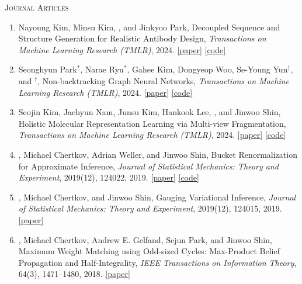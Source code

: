 \vspace{0.5\baselineskip}
\textsc{Journal Articles}
\begin{enumerate}
\item Nayoung Kim, Minsu Kim, , and Jinkyoo Park, Decoupled Sequence and Structure Generation for Realistic Antibody Design, \textit{Transactions on Machine Learning Research (TMLR)}, 2024. \mbox{\href{https://arxiv.org/abs/2402.05982}{[paper]}} \mbox{\href{https://github.com/nayoung10/ASSD}{[code]}}
\item Seonghyun Park$^*$, Narae Ryu$^*$, Gahee Kim, Dongyeop Woo, Se-Young Yun$^\dagger$, and $^\dagger$, Non-backtracking Graph Neural Networks, \textit{Transactions on Machine Learning Research (TMLR)}, 2024. \mbox{\href{https://arxiv.org/abs/2310.07430}{[paper]}} \mbox{\href{https://github.com/seonghyun26/nba-gnn}{[code]}}
\item Seojin Kim, Jaehyun Nam, Junsu Kim, Hankook Lee, , and Jinwoo Shin, Holistic Molecular Representation Learning via Multi-view Fragmentation, \textit{Transactions on Machine Learning Research (TMLR)}, 2024. \mbox{\href{https://openreview.net/forum?id=ufDh55J1ML}{[paper]}} \mbox{\href{https://github.com/Seojin-Kim/HoliMol}{[code]}}
\item {}, Michael Chertkov, Adrian Weller, and Jinwoo Shin, Bucket Renormalization for Approximate Inference, \textit{Journal of Statistical Mechanics: Theory and Experiment}, 2019(12), 124022, 2019. \mbox{\href{https://arxiv.org/abs/1803.05104}{[paper]}} \mbox{\href{https://github.com/sungsoo-ahn/bucket-renormalization}{[code]}}
\item {}, Michael Chertkov, and Jinwoo Shin, Gauging Variational Inference, \textit{Journal of Statistical Mechanics: Theory and Experiment}, 2019(12), 124015, 2019. \mbox{\href{https://arxiv.org/abs/1703.01056}{[paper]}}
\item {}, Michael Chertkov, Andrew E. Gelfand, Sejun Park, and Jinwoo Shin, Maximum Weight Matching using Odd-sized Cycles: Max-Product Belief Propagation and Half-Integrality, \textit{IEEE Transactions on Information Theory}, 64(3), 1471--1480, 2018. \mbox{\href{https://ieeexplore.ieee.org/document/8241842}{[paper]}}
\end{enumerate}

